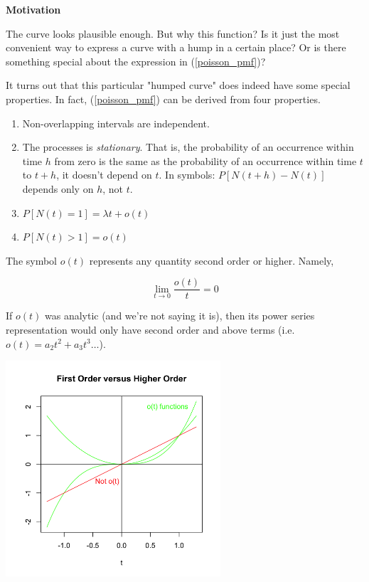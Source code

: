 \documentclass[]{article}
\begin{document}
\textbf{Motivation}

The curve looks plausible
enough.  But why this function?  Is it just the most
convenient way to express a curve with a hump in a certain
place?  Or is there something special about the expression
in (\ref{poisson_pmf})?

It turns out that this particular "humped curve" does indeed
have some special properties.  In fact, (\ref{poisson_pmf})
can be derived from four properties.

\begin{enumerate}  \label{poisson_properties}

\item Non-overlapping intervals are independent.

\item The processes is \emph{stationary}.  That is,
  the probability of an occurrence within time $h$
  from zero is the same as the probability of an occurrence
  within time $t$ to $t + h$, it doesn't depend on $t$.
  In symbols: $P[N(t+h)-N(t)]$ depends only on $h$, not $t$.
  
\item $P[N(t) = 1] = \lambda t + o(t)$

\item $P[N(t) > 1] = o(t)$

\end{enumerate}

The symbol $o(t)$ represents any quantity second order or
higher.  Namely,

$$
\lim_{t \rightarrow 0} \frac{o(t)}{t} = 0
$$

If $o(t)$ was analytic (and we're not saying it is), then
its power series representation would only have second
order and above terms (i.e. $o(t) = a_2t^2 + a_3t^3 \ldots$).

  \includegraphics[height=8cm,keepaspectratio]{ot.png}
\end{document}
